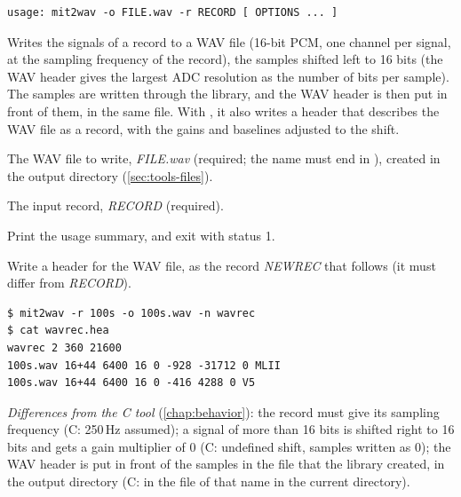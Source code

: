 \begin{lstlisting}[style=signature,language={}]
usage: mit2wav -o FILE.wav -r RECORD [ OPTIONS ... ]
\end{lstlisting}
Writes the signals of a record to a WAV file (16-bit PCM, one channel per signal, at the
sampling frequency of the record), the samples shifted left to 16 bits (the WAV header gives
the largest ADC resolution as the number of bits per sample). The samples are written
through the library, and the WAV header is then put in front of them, in the same file.
With , it also writes a header that describes the WAV file as a record, with the
gains and baselines adjusted to the shift.
\begin{params}
\item[-o] The WAV file to write, \textit{FILE.wav} (required; the name must end in
  ), created in the output directory (\cref{sec:tools-files}).
\item[-r] The input record, \textit{RECORD} (required).
\item[-h] Print the usage summary, and exit with status 1.
\item[-n] Write a header for the WAV file, as the record \textit{NEWREC} that follows (it
  must differ from \textit{RECORD}).
\end{params}
\begin{lstlisting}[style=text]
$ mit2wav -r 100s -o 100s.wav -n wavrec
$ cat wavrec.hea
wavrec 2 360 21600
100s.wav 16+44 6400 16 0 -928 -31712 0 MLII
100s.wav 16+44 6400 16 0 -416 4288 0 V5
\end{lstlisting}
\textit{Differences from the C tool} (\cref{chap:behavior}): the record must give its
sampling frequency (C: 250\,Hz assumed); a signal of more than 16 bits is shifted right to
16 bits and gets a gain multiplier of 0 (C: undefined shift, samples written as 0); the WAV
header is put in front of the samples in the file that the library created, in the output
directory (C: in the file of that name in the current directory).

